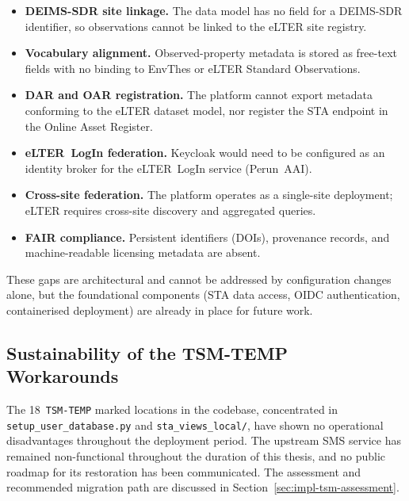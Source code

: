 \begin{itemize}
  \item \textbf{DEIMS-SDR site linkage.} The data model has no field for a DEIMS-SDR
    identifier, so observations cannot be linked to the eLTER site registry.
  \item \textbf{Vocabulary alignment.} Observed-property metadata is stored as
    free-text fields with no binding to EnvThes or eLTER Standard Observations.
  \item \textbf{DAR and OAR registration.} The platform cannot export metadata
    conforming to the eLTER dataset model, nor register the STA endpoint in the
    Online Asset Register.
  \item \textbf{eLTER~LogIn federation.} Keycloak would need to be configured as
    an identity broker for the eLTER~LogIn service (Perun~AAI).
  \item \textbf{Cross-site federation.} The platform operates as a single-site
    deployment; eLTER requires cross-site discovery and aggregated queries.
  \item \textbf{FAIR compliance.} Persistent identifiers (DOIs), provenance records,
    and machine-readable licensing metadata are absent.
\end{itemize}

These gaps are architectural and cannot be addressed by configuration changes
alone, but the foundational components (STA data access, OIDC authentication,
containerised deployment) are already in place for future work.

\subsection{Sustainability of the TSM-TEMP Workarounds}
\label{sec:test-deployment-tsmtemp}

The 18~\texttt{TSM-TEMP} marked locations in the codebase, concentrated in
\texttt{setup\_user\_database.py} and \texttt{sta\_views\_local/}, have shown no
operational disadvantages throughout the deployment period. The upstream SMS
service has remained non-functional throughout the duration of this thesis, and
no public roadmap for its restoration has been communicated. The assessment and
recommended migration path are discussed in
Section~\ref{sec:impl-tsm-assessment}.
